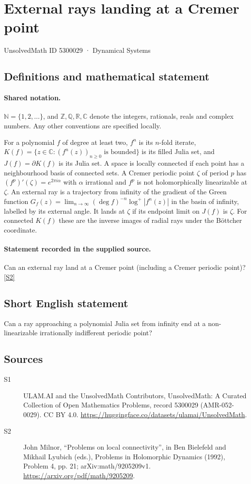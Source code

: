 \documentclass[11pt]{article}
\newcommand{\sref}[2]{\hyperlink{source:#1:#2}{[S#2]}}
\begin{document}
\setcounter{section}{5300028}
\section{External rays landing at a Cremer point}\label{5300029}
{\small\sffamily UnsolvedMath ID 5300029 · Dynamical Systems}
\subsection{Definitions and mathematical statement}

\paragraph{Shared notation.}$\mathbb N=\{1,2,\ldots\}$, and $\mathbb Z,\mathbb Q,\mathbb R,\mathbb C$ denote the integers, rationals, reals and complex numbers. Any other conventions are specified locally.


For a polynomial $f$ of degree at least two, $f^n$ is its $n$-fold iterate, $K(f)=\{z\in\mathbb C:(f^n(z))_{n\geq0}\text{ is bounded}\}$ is its filled Julia set, and $J(f)=\partial K(f)$ is its Julia set. A space is locally connected if each point has a neighbourhood basis of connected sets. A Cremer periodic point $\zeta$ of period $p$ has $(f^p)'(\zeta)=e^{2\pi i\alpha}$ with $\alpha$ irrational and $f^p$ is not holomorphically linearizable at $\zeta$. An external ray is a trajectory from infinity of the gradient of the Green function $G_f(z)=\lim_{n\to\infty}(\deg f)^{-n}\log^+|f^n(z)|$ in the basin of infinity, labelled by its external angle. It lands at $\zeta$ if its endpoint limit on $J(f)$ is $\zeta$. For connected $K(f)$ these are the inverse images of radial rays under the Böttcher coordinate.
\paragraph{Statement recorded in the supplied source.}
Can an external ray land at a Cremer point (including a Cremer periodic point)? \sref{5300029}{2}
\subsection{Short English statement}
Can a ray approaching a polynomial Julia set from infinity end at a non-linearizable irrationally indifferent periodic point?
\subsection{Sources}
\begin{description}
\item[\hypertarget{source:5300029:1}{S1}] ULAM.AI and the UnsolvedMath Contributors, UnsolvedMath: A Curated Collection of Open Mathematics Problems, record 5300029 (AMR-052-0029). CC BY 4.0. \url{https://huggingface.co/datasets/ulamai/UnsolvedMath}.
\item[\hypertarget{source:5300029:2}{S2}] John Milnor, ``Problems on local connectivity'', in Ben Bielefeld and Mikhail Lyubich (eds.), Problems in Holomorphic Dynamics (1992), Problem 4, pp. 21; arXiv:math/9205209v1. \url{https://arxiv.org/pdf/math/9205209}.
\end{description}
\label{end:5300029}
\end{document}

